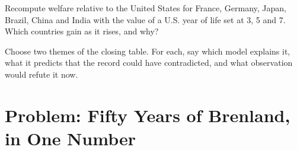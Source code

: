 \begin{exercise}[$\star\star\star$]\label{exo:b3:income-and-wellbeing-evidence:11}
Recompute welfare relative to the United States for France, Germany, Japan, Brazil, China
and India with the value of a U.S. year of life set at 3, 5 and 7. Which countries gain as it rises, and why?
\end{exercise}

\begin{exercise}[$\star\star\star$]\label{exo:b3:income-and-wellbeing-evidence:12}
Choose two themes of the closing table. For each, say which model explains it, what
it predicts that the record could have contradicted, and what observation would
refute it now.
\end{exercise}

\section{Problem: Fifty Years of Brenland, in One Number}\label{sec:b3:income-and-wellbeing-evidence:problem}

